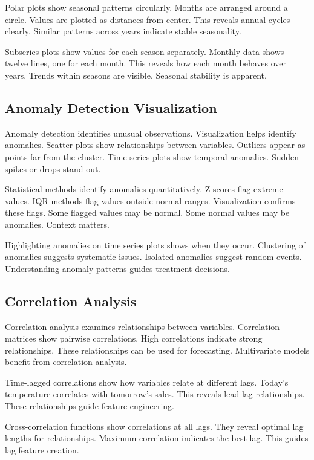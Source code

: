 Polar plots show seasonal patterns circularly. Months are arranged around a circle. Values are plotted as distances from center. This reveals annual cycles clearly. Similar patterns across years indicate stable seasonality.

Subseries plots show values for each season separately. Monthly data shows twelve lines, one for each month. This reveals how each month behaves over years. Trends within seasons are visible. Seasonal stability is apparent.

\subsection{Anomaly Detection Visualization}

Anomaly detection identifies unusual observations. Visualization helps identify anomalies. Scatter plots show relationships between variables. Outliers appear as points far from the cluster. Time series plots show temporal anomalies. Sudden spikes or drops stand out.

Statistical methods identify anomalies quantitatively. Z-scores flag extreme values. IQR methods flag values outside normal ranges. Visualization confirms these flags. Some flagged values may be normal. Some normal values may be anomalies. Context matters.

Highlighting anomalies on time series plots shows when they occur. Clustering of anomalies suggests systematic issues. Isolated anomalies suggest random events. Understanding anomaly patterns guides treatment decisions.

\subsection{Correlation Analysis}

Correlation analysis examines relationships between variables. Correlation matrices show pairwise correlations. High correlations indicate strong relationships. These relationships can be used for forecasting. Multivariate models benefit from correlation analysis.

Time-lagged correlations show how variables relate at different lags. Today's temperature correlates with tomorrow's sales. This reveals lead-lag relationships. These relationships guide feature engineering.

Cross-correlation functions show correlations at all lags. They reveal optimal lag lengths for relationships. Maximum correlation indicates the best lag. This guides lag feature creation.

